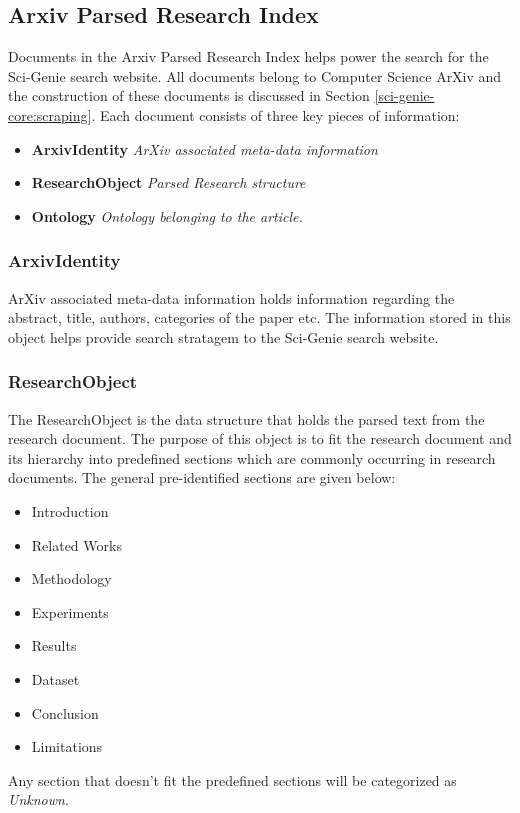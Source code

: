 \subsection{Arxiv Parsed Research Index}

Documents in the Arxiv Parsed Research Index helps power the search for the Sci-Genie search website. All documents belong to Computer Science ArXiv and 
the construction of these documents is discussed in Section \ref{sci-genie-core:scraping}. Each document consists of three 
key pieces of information:
\begin{itemize}
    \item \textbf{ArxivIdentity} \textit{ArXiv associated meta-data information}
    \item \textbf{ResearchObject} \textit{Parsed Research structure}
    \item \textbf{Ontology} \textit{Ontology belonging to the article.}
\end{itemize}

\subsubsection{ArxivIdentity}
ArXiv associated meta-data information holds information regarding the abstract, title, authors, categories of the paper etc. 
The information stored in this object helps provide search stratagem to the Sci-Genie search website. 

\subsubsection{ResearchObject}
\label{sci-genie-core:data-layer:researchobj}
The ResearchObject is the data structure that holds the parsed text from the research document. 
The purpose of this object is to fit the research document and its hierarchy into predefined sections
which are commonly occurring in research documents. The general pre-identified sections are given below:
\begin{itemize}
    \item Introduction
    \item Related Works
    \item Methodology
    \item Experiments
    \item Results
    \item Dataset
    \item Conclusion
    \item Limitations
\end{itemize} 
Any section that doesn't fit the predefined sections will be categorized as \textit{Unknown}. 

